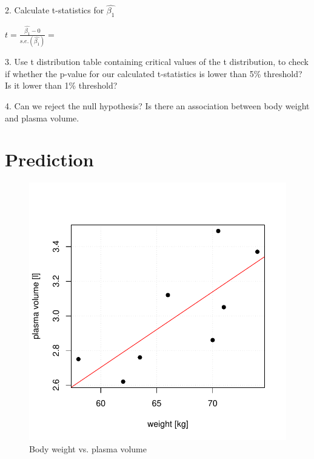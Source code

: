 \documentclass[12pt]{article}\usepackage[]{graphicx}\usepackage[]{color}
\makeatletter
\def\maxwidth{ %
  \ifdim\Gin@nat@width>\linewidth
    \linewidth
  \else
    \Gin@nat@width
  \fi
}
\newenvironment{knitrout}{}{} %
\makeatother
\begin{document}
2. Calculate t-statistics for $\hat{\beta_1}$ \newline

$t=\frac{\hat{\beta_1}-0}{s.e.(\hat{\beta_1})} = $
\vspace{0.2cm}

3. Use t distribution table containing critical values of the t distribution, to check if whether the p-value for our calculated t-statistics is lower than 5\% threshold? Is it lower than 1\% threshold?

4. Can we reject the null hypothesis? Is there an association between body weight and plasma volume. 

\newpage
\section{Prediction}

\begin{knitrout}
\color{fgcolor}\begin{figure}[H]

{\centering \includegraphics[width=\maxwidth]{figure/fig-prediction-1} 

}

\caption[Body weight vs]{Body weight vs. plasma volume}\label{fig:fig-prediction}
\end{figure}


\end{knitrout}
\end{document}
